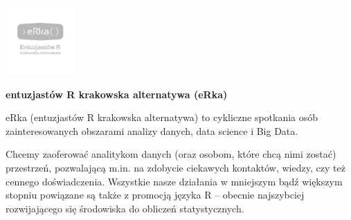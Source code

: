 \documentclass[\main/boa.tex]{subfiles}
\begin{document}
	
	\begin{minipage}[t]{0.915\textwidth}
		\center     
		\includegraphics[width=100px]{img/logos.bw/erka.png} 
	\end{minipage}
	\begin{center}
	\Large \textbf {entuzjastów R krakowska alternatywa (eRka)}
	\end{center}
	
	\vskip 0.3cm
	\normalsize 
	
	
	eRka (entuzjastów R krakowska alternatywa) to cykliczne spotkania osób zainteresowanych obszarami analizy danych, data science i Big Data.
	
	Chcemy zaoferować analitykom danych (oraz osobom, które chcą nimi zostać) przestrzeń, pozwalającą m.in. na zdobycie ciekawych kontaktów, wiedzy, czy też cennego doświadczenia. Wszystkie nasze działania w mniejszym bądź większym stopniu powiązane są także z promocją języka R – obecnie najszybciej rozwijającego się środowiska do obliczeń statystycznych.
	
	\vskip 1.5cm
\end{document}
